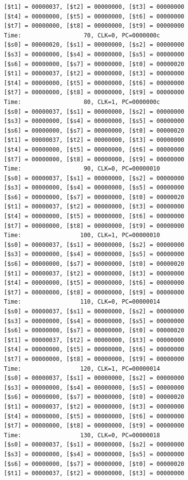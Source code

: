 \documentclass[a4paper,12pt]{article}
\begin{document}
\begin{lstlisting}
[$t1] = 00000037, [$t2] = 00000000, [$t3] = 00000000
[$t4] = 00000000, [$t5] = 00000000, [$t6] = 00000000
[$t7] = 00000000, [$t8] = 00000000, [$t9] = 00000000
Time:                  70, CLK=0, PC=0000000c
[$s0] = 00000020, [$s1] = 00000000, [$s2] = 00000000
[$s3] = 00000000, [$s4] = 00000000, [$s5] = 00000000
[$s6] = 00000000, [$s7] = 00000000, [$t0] = 00000020
[$t1] = 00000037, [$t2] = 00000000, [$t3] = 00000000
[$t4] = 00000000, [$t5] = 00000000, [$t6] = 00000000
[$t7] = 00000000, [$t8] = 00000000, [$t9] = 00000000
Time:                  80, CLK=1, PC=0000000c
[$s0] = 00000037, [$s1] = 00000000, [$s2] = 00000000
[$s3] = 00000000, [$s4] = 00000000, [$s5] = 00000000
[$s6] = 00000000, [$s7] = 00000000, [$t0] = 00000020
[$t1] = 00000037, [$t2] = 00000000, [$t3] = 00000000
[$t4] = 00000000, [$t5] = 00000000, [$t6] = 00000000
[$t7] = 00000000, [$t8] = 00000000, [$t9] = 00000000
Time:                  90, CLK=0, PC=00000010
[$s0] = 00000037, [$s1] = 00000000, [$s2] = 00000000
[$s3] = 00000000, [$s4] = 00000000, [$s5] = 00000000
[$s6] = 00000000, [$s7] = 00000000, [$t0] = 00000020
[$t1] = 00000037, [$t2] = 00000000, [$t3] = 00000000
[$t4] = 00000000, [$t5] = 00000000, [$t6] = 00000000
[$t7] = 00000000, [$t8] = 00000000, [$t9] = 00000000
Time:                 100, CLK=1, PC=00000010
[$s0] = 00000037, [$s1] = 00000000, [$s2] = 00000000
[$s3] = 00000000, [$s4] = 00000000, [$s5] = 00000000
[$s6] = 00000000, [$s7] = 00000000, [$t0] = 00000020
[$t1] = 00000037, [$t2] = 00000000, [$t3] = 00000000
[$t4] = 00000000, [$t5] = 00000000, [$t6] = 00000000
[$t7] = 00000000, [$t8] = 00000000, [$t9] = 00000000
Time:                 110, CLK=0, PC=00000014
[$s0] = 00000037, [$s1] = 00000000, [$s2] = 00000000
[$s3] = 00000000, [$s4] = 00000000, [$s5] = 00000000
[$s6] = 00000000, [$s7] = 00000000, [$t0] = 00000020
[$t1] = 00000037, [$t2] = 00000000, [$t3] = 00000000
[$t4] = 00000000, [$t5] = 00000000, [$t6] = 00000000
[$t7] = 00000000, [$t8] = 00000000, [$t9] = 00000000
Time:                 120, CLK=1, PC=00000014
[$s0] = 00000037, [$s1] = 00000000, [$s2] = 00000000
[$s3] = 00000000, [$s4] = 00000000, [$s5] = 00000000
[$s6] = 00000000, [$s7] = 00000000, [$t0] = 00000020
[$t1] = 00000037, [$t2] = 00000000, [$t3] = 00000000
[$t4] = 00000000, [$t5] = 00000000, [$t6] = 00000000
[$t7] = 00000000, [$t8] = 00000000, [$t9] = 00000000
Time:                 130, CLK=0, PC=00000018
[$s0] = 00000037, [$s1] = 00000000, [$s2] = 00000000
[$s3] = 00000000, [$s4] = 00000000, [$s5] = 00000000
[$s6] = 00000000, [$s7] = 00000000, [$t0] = 00000020
[$t1] = 00000037, [$t2] = 00000000, [$t3] = 00000000

\end{lstlisting}
\end{document}
